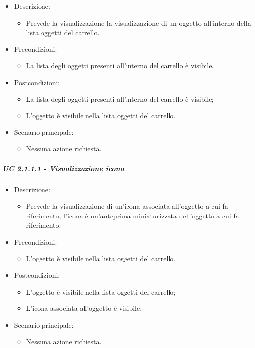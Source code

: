 \begin{itemize}
	
	\item Descrizione:
	\begin{itemize}
		\item Prevede la visualizzazione la visualizzazione di un oggetto all'interno della lista oggetti del carrello.
	\end{itemize}
	
	\item Precondizioni:
	\begin{itemize}
		\item La lista degli oggetti presenti all'interno del carrello è visibile.
	\end{itemize}
	
	\item Postcondizioni:
	\begin{itemize}
		\item La lista degli oggetti presenti all'interno del carrello è visibile;
		\item L'oggetto è visibile nella lista oggetti del carrello.
	\end{itemize}
	
	\item Scenario principale:
	\begin{itemize}
		\item Nessuna azione richiesta.
	\end{itemize}
	
\end{itemize}

\subparagraph{UC 2.1.1.1 - Visualizzazione icona}
\begin{itemize}
	
	\item Descrizione:
	\begin{itemize}
		\item Prevede la visualizzazione di un'icona associata all'oggetto a cui fa riferimento, l'icona è un'anteprima miniaturizzata dell'oggetto a cui fa riferimento.
	\end{itemize}
	
	\item Precondizioni:
	\begin{itemize}
		\item L'oggetto è visibile nella lista oggetti del carrello.
	\end{itemize}
	
	\item Postcondizioni:
	\begin{itemize}
		\item L'oggetto è visibile nella lista oggetti del carrello;
		\item L'icona associata all'oggetto è visibile.
	\end{itemize}
	
	\item Scenario principale:
	\begin{itemize}
		\item Nessuna azione richiesta.
	\end{itemize}
	
\end{itemize}

